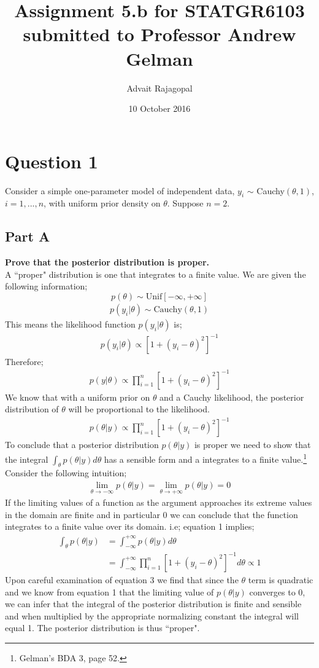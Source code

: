 \documentclass{article}
\title{Assignment 5.b for \textbf{STATGR6103}\\
\large submitted to Professor Andrew Gelman}
\date{10 October 2016}
\author{Advait Rajagopal}
\begin{document}
\maketitle
\section{Question 1}
Consider a simple one-parameter model of independent data, $y_i$ $\sim$ Cauchy$(\theta, 1)$, $i = 1, . . . , n$, with uniform prior density on $\theta$. Suppose $n = 2$.
\subsection{Part A}
\textbf{Prove that the posterior distribution is proper.}\\
A ``proper" distribution is one that integrates to a finite value. We are given the following information;
$$p(\theta) \sim \text{Unif}[-\infty, +\infty]$$
\begin{align*}
p(y_i|\theta) \sim \text{Cauchy}(\theta,1)
\end{align*}
This means the likelihood function $p(y_i|\theta)$ is;
\begin{align*}
p(y_i|\theta) \propto [1+(y_i - \theta)^2]^{-1}
\end{align*}
Therefore;
\begin{align*}
p(y|\theta) \propto \prod_{i = 1}^{n}[1+(y_i - \theta)^2]^{-1}
\end{align*}
We know that with a uniform prior on $\theta$ and a Cauchy likelihood, the posterior distribution of $\theta$ will be proportional to the likelihood.
\begin{align*}
p(\theta|y) \propto \prod_{i = 1}^{n}[1+(y_i - \theta)^2]^{-1}
\end{align*}
To conclude that a posterior distribution $p(\theta|y)$ is proper we need to show that the integral $\int_{\theta} p(\theta|y)d\theta$ has a sensible form and a integrates to a finite value.\footnote{Gelman's BDA 3, page 52.}
Consider the following intuition;
\begin{align}
\lim_{\theta \rightarrow -\infty} p(\theta|y) = \lim_{\theta \rightarrow +\infty} p(\theta|y) = 0
\end{align}
If the limiting values of a function as the argument approaches its extreme values in the domain are finite and in particular 0 we can conclude that the function integrates to a finite value over its domain. i.e; equation 1 implies;
\begin{align}
\int_\theta p(\theta|y) &= \int_{-\infty}^{+\infty} p(\theta|y)d\theta\\  
                &= \int_{-\infty}^{+\infty} \prod_{i = 1}^{n}[1+(y_i - \theta)^2]^{-1}d\theta \propto 1
\end{align}
Upon careful examination of equation 3 we find that since the $\theta$ term is quadratic and we know from equation 1 that the limiting value of $p(\theta|y)$ converges to 0, we can infer that the integral of the posterior distribution is finite and sensible and when multiplied by the appropriate normalizing constant the integral will equal 1. The posterior distribution is thus ``proper".
\end{document}
